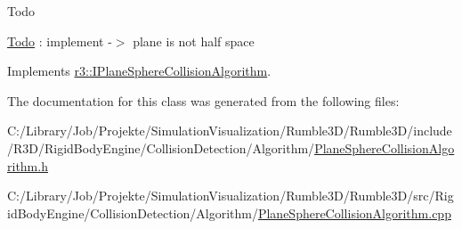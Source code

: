 \begin{DoxyRefDesc}{Todo}
\item[\mbox{\hyperlink{todo__todo000016}{Todo}}]\+: implement -\/$>$ plane is not half space \end{DoxyRefDesc}


Implements \mbox{\hyperlink{classr3_1_1_i_plane_sphere_collision_algorithm_a92ddfd3ba00ed53b183a6aef41b04a60}{r3\+::\+I\+Plane\+Sphere\+Collision\+Algorithm}}.



The documentation for this class was generated from the following files\+:\begin{DoxyCompactItemize}
\item 
C\+:/\+Library/\+Job/\+Projekte/\+Simulation\+Visualization/\+Rumble3\+D/\+Rumble3\+D/include/\+R3\+D/\+Rigid\+Body\+Engine/\+Collision\+Detection/\+Algorithm/\mbox{\hyperlink{_plane_sphere_collision_algorithm_8h}{Plane\+Sphere\+Collision\+Algorithm.\+h}}\item 
C\+:/\+Library/\+Job/\+Projekte/\+Simulation\+Visualization/\+Rumble3\+D/\+Rumble3\+D/src/\+Rigid\+Body\+Engine/\+Collision\+Detection/\+Algorithm/\mbox{\hyperlink{_plane_sphere_collision_algorithm_8cpp}{Plane\+Sphere\+Collision\+Algorithm.\+cpp}}\end{DoxyCompactItemize}
